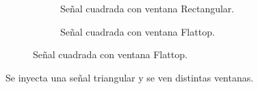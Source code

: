 \begin{figure}[H]
\begin{subfigure}[H]{0.48\textwidth}
          \caption{Señal cuadrada con ventana Rectangular.}
          \label{fig:Exp6SeñalFMModulanteCuadradaRectangular}
        \end{subfigure}
        \begin{subfigure}[H]{0.48\textwidth}
          \caption{Señal cuadrada con ventana Flattop.}
          \label{fig:Exp6SeñalFMModulanteCuadradaFlattop}
        \end{subfigure}
      \end{figure}   

      Se inyecta una señal triangular y se ven distintas ventanas.

